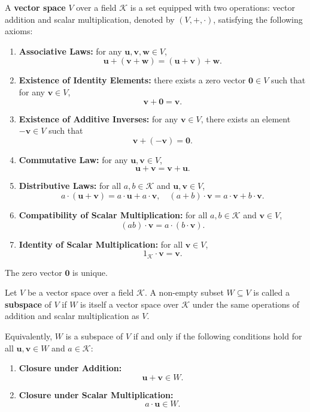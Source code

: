 \begin{definitionenv}
	A \textbf{vector space} $V$ over a field $\mathcal{K}$ is a set equipped with two operations:
	vector addition and scalar multiplication, denoted by $(V, +, \cdot)$, satisfying the following axioms:

	\begin{enumerate}
		\item \textbf{Associative Laws:} for any $\bm{u}, \bm{v}, \bm{w} \in V$,
		\[
		\bm{u} + (\bm{v} + \bm{w}) = (\bm{u} + \bm{v}) + \bm{w}.
		\]

		\item \textbf{Existence of Identity Elements:}
		there exists a zero vector $\bm{0} \in V$ such that for any $\bm{v} \in V$,
		\[
		\bm{v} + \bm{0} = \bm{v}.
		\]

		\item \textbf{Existence of Additive Inverses:}
		for any $\bm{v} \in V$, there exists an element $-\bm{v} \in V$ such that
		\[
		\bm{v} + (-\bm{v}) = \bm{0}.
		\]

		\item \textbf{Commutative Law:}
		for any $\bm{u}, \bm{v} \in V$,
		\[
		\bm{u} + \bm{v} = \bm{v} + \bm{u}.
		\]

		\item \textbf{Distributive Laws:}
		for all $a, b \in \mathcal{K}$ and $\bm{u}, \bm{v} \in V$,
		\[
		a \cdot (\bm{u} + \bm{v}) = a \cdot \bm{u} + a \cdot \bm{v},
		\quad (a + b) \cdot \bm{v} = a \cdot \bm{v} + b \cdot \bm{v}.
		\]

		\item \textbf{Compatibility of Scalar Multiplication:}
		for all $a, b \in \mathcal{K}$ and $\bm{v} \in V$,
		\[
		(a b) \cdot \bm{v} = a \cdot (b \cdot \bm{v}).
		\]

		\item \textbf{Identity of Scalar Multiplication:}
		for all $\bm{v} \in V$,
		\[
		1_{\mathcal{K}} \cdot \bm{v} = \bm{v}.
		\]
	\end{enumerate}
\end{definitionenv}
\begin{theoremenv}
	The zero vector $\bm{0}$ is unique.
\end{theoremenv}
\begin{definitionenv}
	Let $V$ be a vector space over a field $\mathcal{K}$.
	A non-empty subset $W \subseteq V$ is called a \textbf{subspace} of $V$ if $W$ is itself a vector space over $\mathcal{K}$ under the same operations of addition and scalar multiplication as $V$.

	Equivalently, $W$ is a subspace of $V$ if and only if the following conditions hold for all $\bm{u}, \bm{v} \in W$ and $a \in \mathcal{K}$:
	\begin{enumerate}
		\item \textbf{Closure under Addition:}
		\[
		\bm{u} + \bm{v} \in W.
		\]
		\item \textbf{Closure under Scalar Multiplication:}
		\[
		a \cdot \bm{u} \in W.
		\]
	\end{enumerate}

\end{definitionenv}
